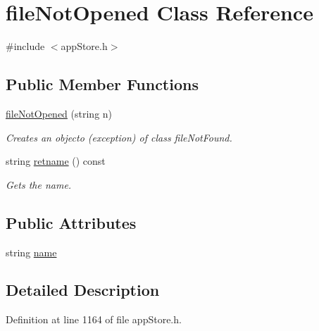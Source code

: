 \hypertarget{classfile_not_opened}{\section{file\-Not\-Opened Class Reference}
\label{classfile_not_opened}
}


{\ttfamily \#include $<$app\-Store.\-h$>$}

\subsection*{Public Member Functions}
\begin{DoxyCompactItemize}
\item 
\hyperlink{classfile_not_opened_ab04749f60a5b73b91e9fe2627656a8d8}{file\-Not\-Opened} (string n)
\begin{DoxyCompactList}\small\item\em Creates an objecto (exception) of class file\-Not\-Found. \end{DoxyCompactList}\item 
string \hyperlink{classfile_not_opened_a6d3d6a490c98ec642e942967826e1f45}{retname} () const 
\begin{DoxyCompactList}\small\item\em Gets the name. \end{DoxyCompactList}\end{DoxyCompactItemize}
\subsection*{Public Attributes}
\begin{DoxyCompactItemize}
\item 
string \hyperlink{classfile_not_opened_ae8cc2e233be82d6aeb8acb7d24de490d}{name}
\end{DoxyCompactItemize}


\subsection{Detailed Description}


Definition at line 1164 of file app\-Store.\-h.



